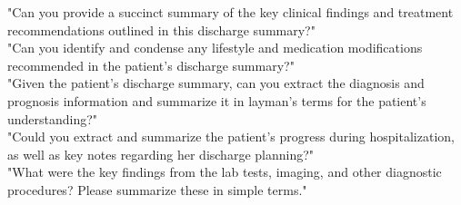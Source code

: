 "Can you provide a succinct summary of the key clinical findings and treatment recommendations outlined in this discharge summary?"\\
"Can you identify and condense any lifestyle and medication modifications recommended in the patient's discharge summary?"\\
"Given the patient's discharge summary, can you extract the diagnosis and prognosis information and summarize it in layman's terms for the patient's understanding?"\\
"Could you extract and summarize the patient's progress during hospitalization, as well as key notes regarding her discharge planning?"\\
"What were the key findings from the lab tests, imaging, and other diagnostic procedures? Please summarize these in simple terms."